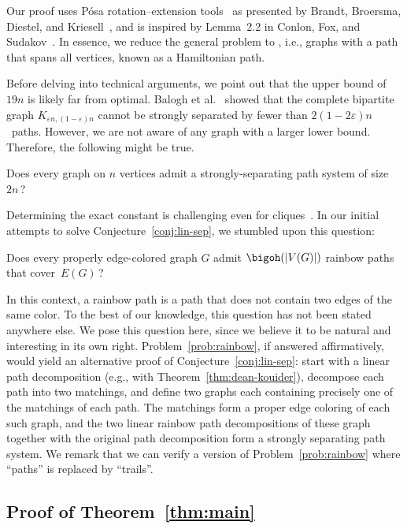 Our proof uses Pósa rotation--extension tools~\cite{posa1976hamiltonian}
as presented by Brandt, Broersma, Diestel, and Kriesell~\cite{brandt2006global},
and is inspired by  Lemma~2.2 in Conlon, Fox, and Sudakov~\cite{conlon2014cycle}.
In essence, we reduce the general problem to
, i.e., graphs with a path that spans all vertices, known as a Hamiltonian path.

Before delving into technical arguments, we point out that the upper bound of $19n$ is likely far from optimal.
Balogh et al.~\cite[Theorem 10]{balogh2016path} showed that the complete bipartite graph \(K_{\varepsilon n,(1-\varepsilon)n}\)
cannot be strongly separated by fewer than \(2(1-2\varepsilon)n\)~paths.
However, we are not aware of any graph with a larger lower bound. Therefore, the following might be true.
\begin{problem}
  Does every graph on $n$ vertices admit a strongly-separating path system of size~$2n$\,?
\end{problem}
Determining the exact constant is challenging even for cliques~\cite{wickes}.
In our initial attempts to solve Conjecture~\ref{conj:lin-sep}, we stumbled upon this question:

\begin{problem}\label{prob:rainbow}
Does every properly edge-colored graph \(G\) admit
$\bigoh(|V(G)|)$ rainbow paths that cover~$E(G)$\,?
\end{problem}

In this context, a rainbow path is a path that does not contain two edges of the same color.
To the best of our knowledge, this question has not been stated anywhere else.
  We pose this question here, since we believe it to be natural and interesting in its own right.
Problem~\ref{prob:rainbow}, if answered affirmatively, would yield an alternative proof of Conjecture~\ref{conj:lin-sep}:
start with a linear path decomposition (e.g., with Theorem~\ref{thm:dean-kouider}),
decompose each path into two matchings, and define two graphs each containing precisely one of the matchings of each path.
The matchings form a proper edge coloring of each such graph,
and the two linear rainbow path decompositions of these graph together with the original path decomposition form a strongly separating path system.  We remark that we can verify a version of Problem~\ref{prob:rainbow}  where ``paths'' is replaced by ``trails''.




\subsection*{Proof of Theorem~\ref{thm:main}}

